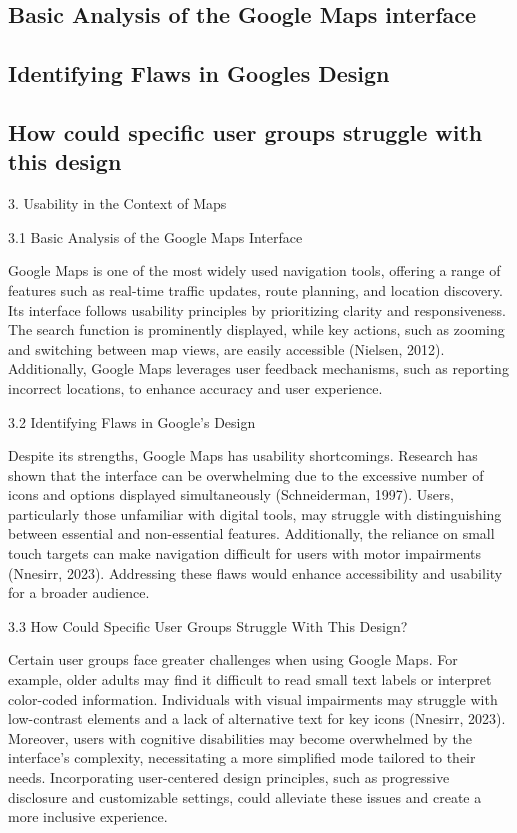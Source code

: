 \subsection{Basic Analysis of the Google Maps interface}

\subsection{Identifying Flaws in Googles Design}

\subsection{How could specific user groups struggle with this design}


3. Usability in the Context of Maps

3.1 Basic Analysis of the Google Maps Interface

Google Maps is one of the most widely used navigation tools, offering a range of features such as real-time traffic updates, route planning, and location discovery. Its interface follows usability principles by prioritizing clarity and responsiveness. The search function is prominently displayed, while key actions, such as zooming and switching between map views, are easily accessible (Nielsen, 2012). Additionally, Google Maps leverages user feedback mechanisms, such as reporting incorrect locations, to enhance accuracy and user experience.

3.2 Identifying Flaws in Google's Design

Despite its strengths, Google Maps has usability shortcomings. Research has shown that the interface can be overwhelming due to the excessive number of icons and options displayed simultaneously (Schneiderman, 1997). Users, particularly those unfamiliar with digital tools, may struggle with distinguishing between essential and non-essential features. Additionally, the reliance on small touch targets can make navigation difficult for users with motor impairments (Nnesirr, 2023). Addressing these flaws would enhance accessibility and usability for a broader audience.

3.3 How Could Specific User Groups Struggle With This Design?

Certain user groups face greater challenges when using Google Maps. For example, older adults may find it difficult to read small text labels or interpret color-coded information. Individuals with visual impairments may struggle with low-contrast elements and a lack of alternative text for key icons (Nnesirr, 2023). Moreover, users with cognitive disabilities may become overwhelmed by the interface’s complexity, necessitating a more simplified mode tailored to their needs. Incorporating user-centered design principles, such as progressive disclosure and customizable settings, could alleviate these issues and create a more inclusive experience.

